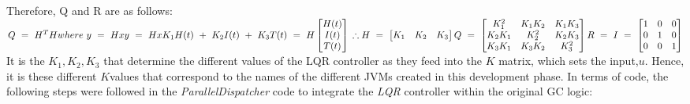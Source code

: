 \newline\newline
Therefore, Q and R are as follows:
\newline\newline
\begin{math}
Q\ =\ H^{T} H\ \\ \\
where\ y\ =\ Hx\\
\\
y\ =\ Hx\\
K_{1} H( t) \ +\ K_{2} I( t) \ +\ K_{3} T( t) \ =\ H\begin{bmatrix}
H( t)\\
I( t)\\
T( t)
\end{bmatrix}\\
\\
\therefore H\ =\ \begin{bmatrix}
K_{1} & K_{2} & K_{3}
\end{bmatrix}\\
\\
Q\ =\ \begin{bmatrix}
K^{2}_{1} & K_{1} K_{2} & K_{1} K_{3}\\
K_{2} K_{1} & K^{2}_{2} & K_{2} K_{3}\\
K_{3} K_{1} & K_{3} K_{2} & K^{2}_{3}
\end{bmatrix}\\
\\
R\ =\ I\ =\ \begin{bmatrix}
1 & 0 & 0\\
0 & 1 & 0\\
0 & 0 & 1
\end{bmatrix}
\end{math}
\newline\newline
It is the \begin{math}  K_{1}, K_{2}, K_{3} \end{math} that determine the different values of the LQR controller as they feed into the \begin{math}K\end{math} matrix, which sets the input,\begin{math} u\end{math}. Hence, it is these different \begin{math}K \end{math}values that correspond to the names of the different JVMs created in this development phase. 
\newline\newline
In terms of code, the following steps were followed in the
\emph{ParallelDispatcher} code to integrate the \emph{LQR} controller within the
original GC logic:

